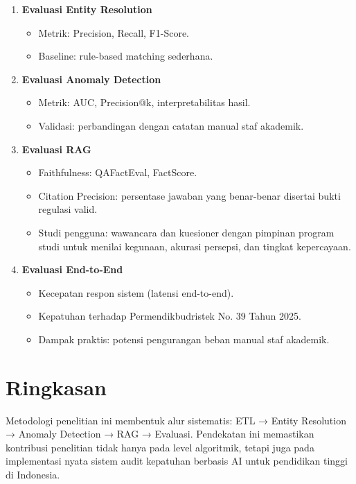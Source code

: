 \documentclass[12pt,a4paper,oneside]{report}
\begin{document}
        \begin{enumerate}
            \item \textbf{Evaluasi Entity Resolution}
            \begin{itemize}
                \item Metrik: Precision, Recall, F1-Score.
                \item Baseline: rule-based matching sederhana.
            \end{itemize}

            \item \textbf{Evaluasi Anomaly Detection}
            \begin{itemize}
                \item Metrik: AUC, Precision@k, interpretabilitas hasil.
                \item Validasi: perbandingan dengan catatan manual staf akademik.
            \end{itemize}

            \item \textbf{Evaluasi RAG}
            \begin{itemize}
                \item Faithfulness: QAFactEval, FactScore.
                \item Citation Precision: persentase jawaban yang benar-benar disertai bukti regulasi valid.
                \item Studi pengguna: wawancara dan kuesioner dengan pimpinan program studi untuk menilai kegunaan, akurasi persepsi, dan tingkat kepercayaan.
            \end{itemize}

            \item \textbf{Evaluasi End-to-End}
            \begin{itemize}
                \item Kecepatan respon sistem (latensi end-to-end).
                \item Kepatuhan terhadap Permendikbudristek No. 39 Tahun 2025.
                \item Dampak praktis: potensi pengurangan beban manual staf akademik.
            \end{itemize}
        \end{enumerate}

        \section{Ringkasan}
        Metodologi penelitian ini membentuk alur sistematis: ETL → Entity Resolution → Anomaly Detection → RAG → Evaluasi. Pendekatan ini memastikan kontribusi penelitian tidak hanya pada level algoritmik, tetapi juga pada implementasi nyata sistem audit kepatuhan berbasis AI untuk pendidikan tinggi di Indonesia.

    \printbibliography[title={Daftar Pustaka}]
\end{document}
